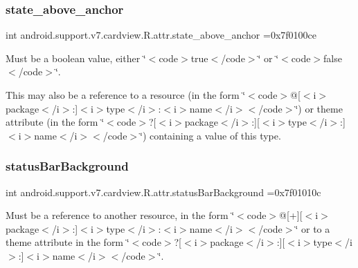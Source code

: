 \subsubsection{\texorpdfstring{state\+\_\+above\+\_\+anchor}{state\_above\_anchor}}
{\footnotesize\ttfamily int android.\+support.\+v7.\+cardview.\+R.\+attr.\+state\+\_\+above\+\_\+anchor =0x7f0100ce\hspace{0.3cm}{\ttfamily [static]}}

Must be a boolean value, either \char`\"{}$<$code$>$true$<$/code$>$\char`\"{} or \char`\"{}$<$code$>$false$<$/code$>$\char`\"{}. 

This may also be a reference to a resource (in the form \char`\"{}$<$code$>$@\mbox{[}$<$i$>$package$<$/i$>$\+:\mbox{]}$<$i$>$type$<$/i$>$\+:$<$i$>$name$<$/i$>$$<$/code$>$\char`\"{}) or theme attribute (in the form \char`\"{}$<$code$>$?\mbox{[}$<$i$>$package$<$/i$>$\+:\mbox{]}\mbox{[}$<$i$>$type$<$/i$>$\+:\mbox{]}$<$i$>$name$<$/i$>$$<$/code$>$\char`\"{}) containing a value of this type. \mbox{\label{classandroid_1_1support_1_1v7_1_1cardview_1_1R_1_1attr_a7089720b877cb43531e27184cd06867b}} 
\subsubsection{\texorpdfstring{status\+Bar\+Background}{statusBarBackground}}
{\footnotesize\ttfamily int android.\+support.\+v7.\+cardview.\+R.\+attr.\+status\+Bar\+Background =0x7f01010c\hspace{0.3cm}{\ttfamily [static]}}

Must be a reference to another resource, in the form \char`\"{}$<$code$>$@\mbox{[}+\mbox{]}\mbox{[}$<$i$>$package$<$/i$>$\+:\mbox{]}$<$i$>$type$<$/i$>$\+:$<$i$>$name$<$/i$>$$<$/code$>$\char`\"{} or to a theme attribute in the form \char`\"{}$<$code$>$?\mbox{[}$<$i$>$package$<$/i$>$\+:\mbox{]}\mbox{[}$<$i$>$type$<$/i$>$\+:\mbox{]}$<$i$>$name$<$/i$>$$<$/code$>$\char`\"{}. \mbox{\label{classandroid_1_1support_1_1v7_1_1cardview_1_1R_1_1attr_a0eaa00e33bfe549c91d9e06f97e36f72}} 
